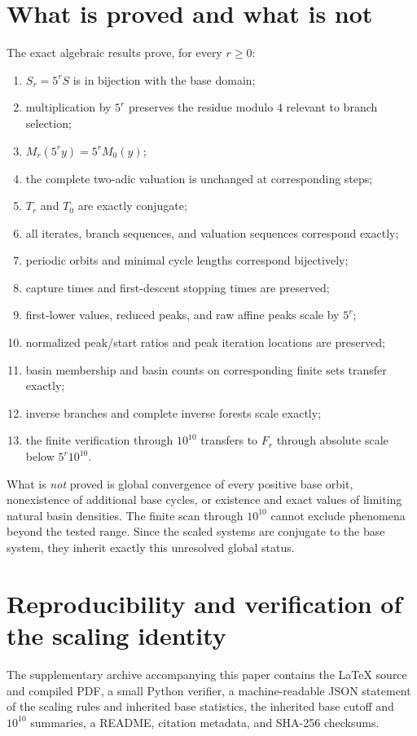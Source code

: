 \documentclass[11pt]{article}
\begin{document}
\section{What is proved and what is not}
The exact algebraic results prove, for every $r\ge0$:
\begin{enumerate}
\item $S_r=5^rS$ is in bijection with the base domain;
\item multiplication by $5^r$ preserves the residue modulo $4$ relevant to branch selection;
\item $M_r(5^ry)=5^rM_0(y)$;
\item the complete two-adic valuation is unchanged at corresponding steps;
\item $T_r$ and $T_0$ are exactly conjugate;
\item all iterates, branch sequences, and valuation sequences correspond exactly;
\item periodic orbits and minimal cycle lengths correspond bijectively;
\item capture times and first-descent stopping times are preserved;
\item first-lower values, reduced peaks, and raw affine peaks scale by $5^r$;
\item normalized peak/start ratios and peak iteration locations are preserved;
\item basin membership and basin counts on corresponding finite sets transfer exactly;
\item inverse branches and complete inverse forests scale exactly;
\item the finite verification through $10^{10}$ transfers to $F_r$ through absolute scale below $5^r10^{10}$.
\end{enumerate}

What is \emph{not} proved is global convergence of every positive base orbit, nonexistence of additional base cycles, or existence and exact values of limiting natural basin densities. The finite scan through $10^{10}$ cannot exclude phenomena beyond the tested range. Since the scaled systems are conjugate to the base system, they inherit exactly this unresolved global status.

\section{Reproducibility and verification of the scaling identity}
The supplementary archive accompanying this paper contains the \LaTeX{} source and compiled PDF, a small Python verifier, a machine-readable JSON statement of the scaling rules and inherited base statistics, the inherited base cutoff and $10^{10}$ summaries, a README, citation metadata, and SHA-256 checksums.
\end{document}
